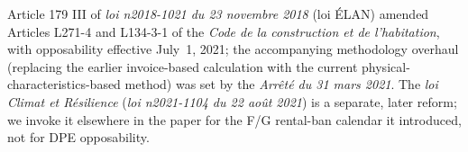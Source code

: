Article 179 III of \emph{loi n\textdegree{}2018-1021 du 23 novembre
2018} (loi \'ELAN) amended Articles L271-4 and L134-3-1 of the \emph{Code de la construction et
de l'habitation}, with opposability effective July~1, 2021; the accompanying methodology
overhaul (replacing the earlier invoice-based calculation with the current
physical-characteristics-based method) was set by the \emph{Arr\^et\'e du 31 mars 2021}. The
\emph{loi Climat et R\'esilience} (\emph{loi n\textdegree{}2021-1104 du 22 ao\^ut 2021}) is a
separate, later reform; we invoke it elsewhere in the paper for the F/G rental-ban calendar it
introduced, not for DPE opposability.